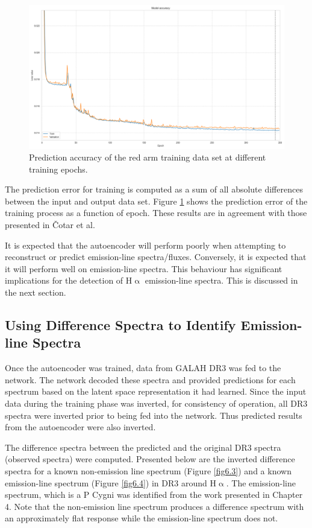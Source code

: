 \begin{figure}[!htb]
\centering
\includegraphics[scale=0.38]{figures/ann_network_loss.png}
\caption{Prediction accuracy of the red arm training data set at different training epochs.}
\label{fig6.2}
\end{figure}

The prediction error for training is computed as a sum of all absolute differences between the input and output data set. Figure \ref{fig6.2} shows the prediction error of the training process as a function of epoch. These results are in agreement with those presented in Čotar et al.

It is expected that the autoencoder will perform poorly when attempting to reconstruct or predict emission-line spectra/fluxes. Conversely, it is expected that it will perform well on emission-line spectra. This behaviour has significant implications for the detection of H$\upalpha$ emission-line spectra. This is discussed in the next section.

\subsection{Using Difference Spectra to Identify Emission-line Spectra}

Once the autoencoder was trained, data from GALAH DR3 was fed to the network. The network decoded these spectra and provided predictions for each spectrum based on the latent space representation it had learned. Since the input data during the training phase was inverted, for consistency of operation, all DR3 spectra were inverted prior to being fed into the network. Thus predicted results from the autoencoder were also inverted.

The difference spectra between the predicted and the original DR3 spectra (observed spectra) were computed. Presented below are the inverted difference spectra for a known non-emission line spectrum (Figure \ref{fig6.3}) and a known emission-line spectrum (Figure \ref{fig6.4}) in DR3 around H$\upalpha$. The emission-line spectrum, which is a P Cygni was identified from the work presented in Chapter 4. Note that the non-emission line spectrum produces a difference spectrum with an approximately flat response while the emission-line spectrum does not. 

